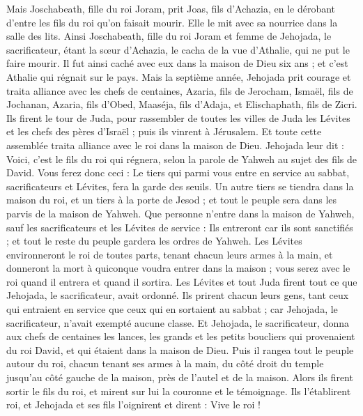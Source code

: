 \begin{multicols}{2}
Mais Joschabeath, fille du roi Joram, prit Joas, fils d'Achazia, en le dérobant d'entre les fils du roi qu'on faisait mourir. Elle le mit avec sa nourrice dans la salle des lits. Ainsi Joschabeath, fille du roi Joram et femme de Jehojada, le sacrificateur, étant la sœur d'Achazia, le cacha de la vue d'Athalie, qui ne put le faire mourir.
Il fut ainsi caché avec eux dans la maison de Dieu six ans ; et c’est Athalie qui régnait sur le pays.
\VerseOne{}Mais la septième année, Jehojada prit courage et traita alliance avec les chefs de centaines, Azaria, fils de Jerocham, Ismaël, fils de Jochanan, Azaria, fils d'Obed, Maaséja, fils d'Adaja, et Elischaphath, fils de Zicri.
Ils firent le tour de Juda, pour rassembler de toutes les villes de Juda les Lévites et les chefs des pères d'Israël ; puis ils vinrent à Jérusalem.
Et toute cette assemblée traita alliance avec le roi dans la maison de Dieu. Jehojada leur dit : Voici, c’est le fils du roi qui régnera, selon la parole de Yahweh au sujet des fils de David.
Vous ferez donc ceci : Le tiers qui parmi vous entre en service au sabbat, sacrificateurs et Lévites, fera la garde des seuils.
Un autre tiers se tiendra dans la maison du roi, et un tiers à la porte de Jesod ; et tout le peuple sera dans les parvis de la maison de Yahweh.
Que personne n'entre dans la maison de Yahweh, sauf les sacrificateurs et les Lévites de service : Ils entreront car ils sont sanctifiés ; et tout le reste du peuple gardera les ordres de Yahweh.
Les Lévites environneront le roi de toutes parts, tenant chacun leurs armes à la main, et donneront la mort à quiconque voudra entrer dans la maison ; vous serez avec le roi quand il entrera et quand il sortira.
Les Lévites et tout Juda firent tout ce que Jehojada, le sacrificateur, avait ordonné. Ils prirent chacun leurs gens, tant ceux qui entraient en service que ceux qui en sortaient au sabbat ; car Jehojada, le sacrificateur, n'avait exempté aucune classe.
Et Jehojada, le sacrificateur, donna aux chefs de centaines les lances, les grands et les petits boucliers qui provenaient du roi David, et qui étaient dans la maison de Dieu.
Puis il rangea tout le peuple autour du roi, chacun tenant ses armes à la main, du côté droit du temple jusqu'au côté gauche de la maison, près de l'autel et de la maison.
Alors ils firent sortir le fils du roi, et mirent sur lui la couronne et le témoignage. Ils l'établirent roi, et Jehojada et ses fils l'oignirent et dirent : Vive le roi !

\end{multicols}
